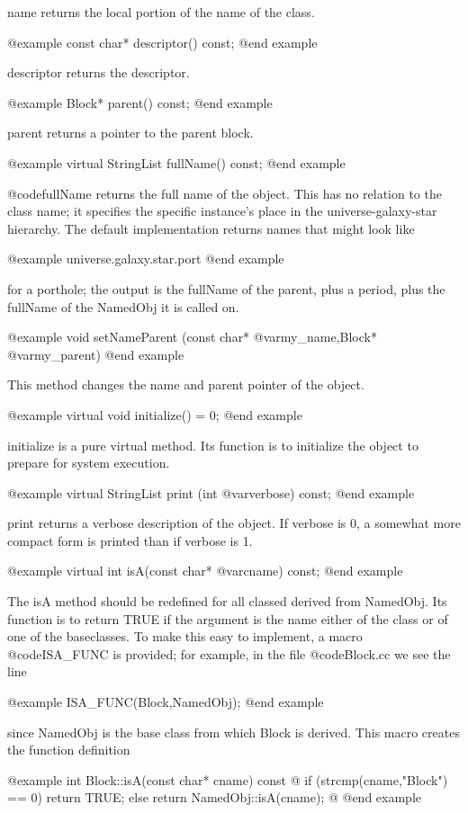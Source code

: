 name returns the local portion of the name of the class.

@example
const char* descriptor() const;
@end example

descriptor returns the descriptor.

@example
Block* parent() const;
@end example

parent returns a pointer to the parent block.

@example
virtual StringList fullName() const;
@end example

@code{fullName} returns the full name of the object.  This has no
relation to the class name; it specifies the specific instance's place
in the universe-galaxy-star hierarchy.  The default
implementation returns names that might look like

@example
universe.galaxy.star.port
@end example

for a porthole; the output is the fullName of the parent, plus a period,
plus the fullName of the NamedObj it is called on.

@example
void setNameParent (const char* @var{my_name},Block* @var{my_parent})
@end example

This method changes the name and parent pointer of the object.

@example
virtual void initialize() = 0;
@end example

initialize is a pure virtual method.  Its function is to initialize the
object to prepare for system execution.

@example
virtual StringList print (int @var{verbose}) const;
@end example

print returns a verbose description of the object.  If verbose is 0, a
somewhat more compact form is printed than if verbose is 1.

@example
virtual int isA(const char* @var{cname}) const;
@end example

The isA method should be redefined for all classed derived from
NamedObj.  Its function is to return TRUE if the argument is the name
either of the class or of one of the baseclasses.  To make this easy to
implement, a macro @code{ISA_FUNC} is provided; for example, in the
file @code{Block.cc} we see the line

@example
ISA_FUNC(Block,NamedObj);
@end example

since NamedObj is the base class from which Block is derived.  This
macro creates the function definition

@example
int Block::isA(const char* cname) const @{
        if (strcmp(cname,"Block") == 0) return TRUE;
        else return NamedObj::isA(cname);
@}
@end example

